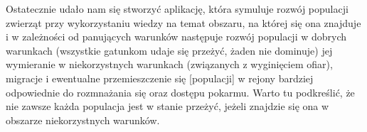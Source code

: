 Ostatecznie udało nam się stworzyć aplikację, która symuluje rozwój populacji zwierząt przy wykorzystaniu wiedzy na temat obszaru, na której się ona znajduje i w zależności od panujących warunków następuje rozwój populacji w dobrych warunkach (wszystkie gatunkom udaje się przeżyć, żaden nie dominuje)  jej wymieranie w niekorzystnych warunkach (związanych z wyginięciem ofiar), migracje i ewentualne przemieszczenie się [populacji] w rejony bardziej odpowiednie do rozmnażania się oraz dostępu pokarmu. Warto tu podkreślić, że nie zawsze każda populacja jest w stanie przeżyć, jeżeli znajdzie się ona w obszarze niekorzystnych warunków.
